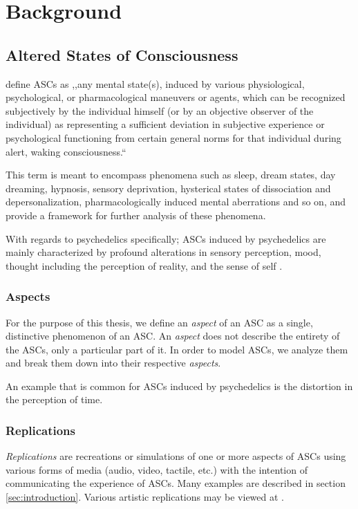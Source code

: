 \chapter{Background}
\vspace{-1.6em}
%

\minitoc
\thispagestyle{empty}
\newpage

\section{Altered States of Consciousness}\label{sec:asc_definition}
\textcite{ludwig1966altered} define \acp{ASC} as ,,any mental state(s), induced by various physiological, psychological, or pharmacological maneuvers or agents, which can be recognized subjectively by the individual himself (or by an objective observer of the individual) as representing a sufficient deviation in subjective experience or psychological functioning from certain general norms for that individual during alert, waking consciousness.``

This term is meant to encompass phenomena such as sleep, dream states, day dreaming, hypnosis, sensory deprivation, hysterical states of dissociation and depersonalization, pharmacologically induced mental aberrations and so on, and provide a framework for further analysis of these phenomena.

With regards to psychedelics specifically; \acp{ASC} induced by psychedelics are mainly characterized by profound alterations in sensory perception, mood, thought including the perception of reality, and the sense of self \autocite{preller2016phenomenology}.

\subsection{Aspects}
For the purpose of this thesis, we define an \textit{aspect} of an \ac{ASC} as a single, distinctive phenomenon of an \ac{ASC}. An \textit{aspect} does not describe the entirety of the \acp{ASC}, only a particular part of it. In order to model \acp{ASC}, we analyze them and break them down into their respective \textit{aspects}.

An example that is common for \acp{ASC} induced by psychedelics is the distortion in the perception of time.

\subsection{Replications}
\textit{Replications} are recreations or simulations of one or more aspects of \acp{ASC} using various forms of media (audio, video, tactile, etc.) with the intention of communicating the experience of \acp{ASC}. Many examples are described in section \ref{sec:introduction}. Various artistic replications may be viewed at \textcite{pw2022replications}.

